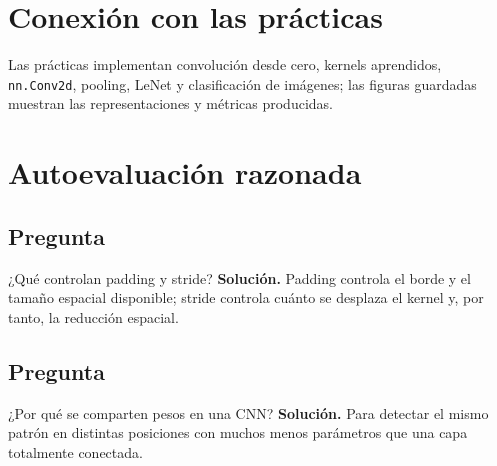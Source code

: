 \section{Conexión con las prácticas}

Las prácticas implementan convolución desde cero, kernels aprendidos, \texttt{nn.Conv2d}, pooling, LeNet y clasificación de imágenes; las figuras guardadas muestran las representaciones y métricas producidas.

\section{Autoevaluación razonada}

\subsection*{Pregunta} ¿Qué controlan padding y stride?
\textbf{Solución.} Padding controla el borde y el tamaño espacial disponible; stride controla cuánto se desplaza el kernel y, por tanto, la reducción espacial.

\subsection*{Pregunta} ¿Por qué se comparten pesos en una CNN?
\textbf{Solución.} Para detectar el mismo patrón en distintas posiciones con muchos menos parámetros que una capa totalmente conectada.
